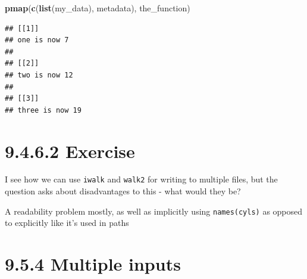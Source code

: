 \documentclass[]{book}
\newenvironment{Shaded}{\begin{snugshade}}{\end{snugshade}}
\newcommand{\KeywordTok}[1]{\textcolor[rgb]{0.13,0.29,0.53}{\textbf{#1}}}
\newcommand{\NormalTok}[1]{#1}
\newcommand{\OperatorTok}[1]{\textcolor[rgb]{0.81,0.36,0.00}{\textbf{#1}}}
\newcommand{\StringTok}[1]{\textcolor[rgb]{0.31,0.60,0.02}{#1}}
\begin{document}
\begin{Shaded}
\begin{Highlighting}[]
\KeywordTok{pmap}\NormalTok{(}\KeywordTok{c}\NormalTok{(}\KeywordTok{list}\NormalTok{(my_data), metadata), the_function)}
\end{Highlighting}
\end{Shaded}

\begin{verbatim}
## [[1]]
## one is now 7
## 
## [[2]]
## two is now 12
## 
## [[3]]
## three is now 19
\end{verbatim}

\hypertarget{exercise-10}{%
\section*{9.4.6.2 Exercise}\label{exercise-10}}

I see how we can use \texttt{iwalk} and \texttt{walk2} for writing to multiple files, but the question asks about disadvantages to this - what would they be?

\begin{Shaded}
\end{Shaded}

A readability problem mostly, as well as implicitly using \texttt{names(cyls)} as opposed to explicitly like it's used in paths

\hypertarget{multiple-inputs}{%
\section*{9.5.4 Multiple inputs}\label{multiple-inputs}}
\end{document}
